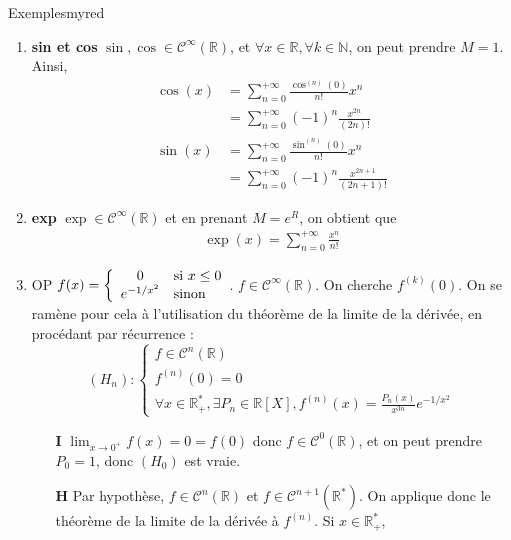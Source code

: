     \begin{omed}{Exemples}{myred}
        \begin{enumerate}[label=\textcolor{myred}{\alph*.}]
            \item \textbf{sin et cos} \quad $\sin, \cos \in \mathcal{C}^{\infty}(\mathbb{R})$, et $\forall x \in \mathbb{R}, \forall k \in \mathbb{N}$, on peut prendre $M = 1$. Ainsi, 
            \begin{align*}
                \cos(x) &= \sum_{n=0}^{+\infty} \frac{\cos^{(n)}(0)}{n!} x^n \\
                &= \sum_{n = 0}^{+\infty} (-1)^n \frac{x^{2n}}{(2n)!} \\
                \sin(x) &= \sum_{n=0}^{+\infty} \frac{\sin^{(n)}(0)}{n!} x^n \\
                &= \sum_{n=0}^{+\infty} (-1)^n \frac{x^{2n + 1}}{(2n+1)!}
            \end{align*}
            \item \textbf{exp} \quad $\exp \in \mathcal{C}^{\infty}(\mathbb{R})$ et en prenant $M = e^R$, on obtient que 
            \begin{align*}
                \exp(x) = \sum_{n=0}^{+\infty} \frac{x^n}{n!}
            \end{align*}
            \item OP $f(x) = \sisinon{0}{x \leq 0}{e^{-1/x^2}}$. $f \in \mathcal{C}^{\infty}(\mathbb{R})$. On cherche $f^{(k)}(0)$. On se ramène pour cela à l’utilisation du théorème de la limite de la dérivée, en procédant par récurrence :
            \[ (H_n) : \left\{ \begin{array}{l}
                f \in \mathcal{C}^n(\mathbb{R}) \\
                f^{(n)}(0) = 0 \\
                \forall x \in \mathbb{R}^*_+, \exists P_n \in \mathbb{R}[X], f^{(n)}(x) = \frac{P_n(x)}{x^{3n}} e^{-1/x^2} 
            \end{array} \right. \]
            \begin{itemize}
                \item[\textbf{I}] $\lim_{x \to 0^+} f(x) = 0 = f(0)$ donc $f \in \mathcal{C}^0(\mathbb{R})$, et on peut prendre $P_0 = 1$, donc $(H_0)$ est vraie.
                \item[\textbf{H}] Par hypothèse, $f \in \mathcal{C}^n(\mathbb{R})$ et $f \in \mathcal{C}^{n+1}(\mathbb{R}^*)$. On applique donc le théorème de la limite de la dérivée à $f^{(n)}$. Si $x \in \mathbb{R}_+^*$,
                \begin{align*}

\end{align*}
\end{itemize}
\end{enumerate}
\end{omed}
